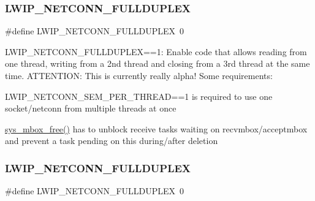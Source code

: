 \subsubsection{\texorpdfstring{L\+W\+I\+P\+\_\+\+N\+E\+T\+C\+O\+N\+N\+\_\+\+F\+U\+L\+L\+D\+U\+P\+L\+EX}{LWIP\_NETCONN\_FULLDUPLEX}\hspace{0.1cm}{\footnotesize\ttfamily [1/2]}}
{\footnotesize\ttfamily \#define L\+W\+I\+P\+\_\+\+N\+E\+T\+C\+O\+N\+N\+\_\+\+F\+U\+L\+L\+D\+U\+P\+L\+EX~0}

L\+W\+I\+P\+\_\+\+N\+E\+T\+C\+O\+N\+N\+\_\+\+F\+U\+L\+L\+D\+U\+P\+L\+EX==1\+: Enable code that allows reading from one thread, writing from a 2nd thread and closing from a 3rd thread at the same time. A\+T\+T\+E\+N\+T\+I\+ON\+: This is currently really alpha! Some requirements\+:
\begin{DoxyItemize}
\item L\+W\+I\+P\+\_\+\+N\+E\+T\+C\+O\+N\+N\+\_\+\+S\+E\+M\+\_\+\+P\+E\+R\+\_\+\+T\+H\+R\+E\+AD==1 is required to use one socket/netconn from multiple threads at once
\item \hyperlink{group__sys__mbox_gac641a45812155d2234ef80dd6412882f}{sys\+\_\+mbox\+\_\+free()} has to unblock receive tasks waiting on recvmbox/acceptmbox and prevent a task pending on this during/after deletion 
\end{DoxyItemize}\mbox{\label{group__lwip__opts__netconn_ga7bfe8487a3abffdd9d6730977d22c406}} 
\subsubsection{\texorpdfstring{L\+W\+I\+P\+\_\+\+N\+E\+T\+C\+O\+N\+N\+\_\+\+F\+U\+L\+L\+D\+U\+P\+L\+EX}{LWIP\_NETCONN\_FULLDUPLEX}\hspace{0.1cm}{\footnotesize\ttfamily [2/2]}}
{\footnotesize\ttfamily \#define L\+W\+I\+P\+\_\+\+N\+E\+T\+C\+O\+N\+N\+\_\+\+F\+U\+L\+L\+D\+U\+P\+L\+EX~0}

